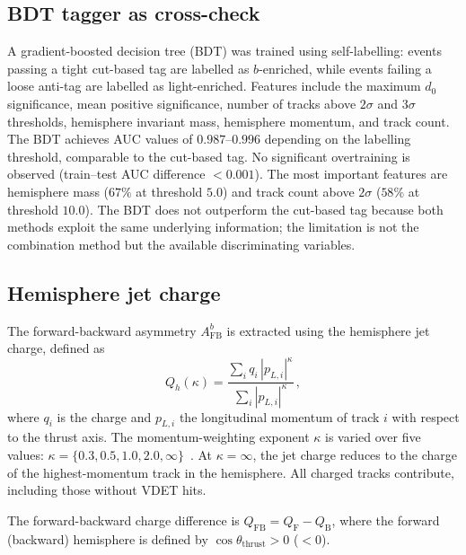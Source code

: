 \documentclass[11pt,a4paper]{article}
\begin{document}
\subsection{BDT tagger as cross-check}
\label{sec:tagging:bdt}

A gradient-boosted decision tree (BDT) was trained using
self-labelling: events passing a tight cut-based tag are labelled
as $b$-enriched, while events failing a loose anti-tag are
labelled as light-enriched.
Features include the maximum $d_0$ significance, mean positive
significance, number of tracks above $2\sigma$ and $3\sigma$
thresholds, hemisphere invariant mass, hemisphere momentum, and
track count.
The BDT achieves AUC values of $0.987$--$0.996$ depending on
the labelling threshold, comparable to the cut-based tag.
No significant overtraining is observed (train--test AUC
difference $< 0.001$).
The most important features are hemisphere mass ($67\%$ at
threshold $5.0$) and track count above $2\sigma$ ($58\%$ at
threshold $10.0$).
The BDT does not outperform the cut-based tag because both
methods exploit the same underlying information; the limitation
is not the combination method but the available discriminating
variables.

\subsection{Hemisphere jet charge}
\label{sec:tagging:jetcharge}

The forward-backward asymmetry $A_\text{FB}^b$ is extracted using
the hemisphere jet charge, defined as
\begin{equation}
Q_h(\kappa) = \frac{\sum_i q_i\, |p_{L,i}|^\kappa}
                    {\sum_i |p_{L,i}|^\kappa}\,,
\label{eq:jet_charge}
\end{equation}
where $q_i$ is the charge and $p_{L,i}$ the longitudinal momentum
of track $i$ with respect to the thrust axis.
The momentum-weighting exponent $\kappa$ is varied over five values:
$\kappa = \{0.3, 0.5, 1.0, 2.0, \infty\}$~\cite{ALEPH:AFBb}.
At $\kappa = \infty$, the jet charge reduces to the charge of the
highest-momentum track in the hemisphere.
All charged tracks contribute, including those without VDET hits.

The forward-backward charge difference is
$Q_\text{FB} = Q_\text{F} - Q_\text{B}$,
where the forward (backward) hemisphere is defined by
$\cos\theta_\text{thrust} > 0$ ($< 0$).
\end{document}

